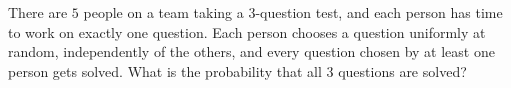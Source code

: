 There are $5$ people on a team taking a $3$-question test, and each person has time to work on exactly one question. Each person chooses a question uniformly at random, independently of the others, and every question chosen by at least one person gets solved. What is the probability that all $3$ questions are solved?
